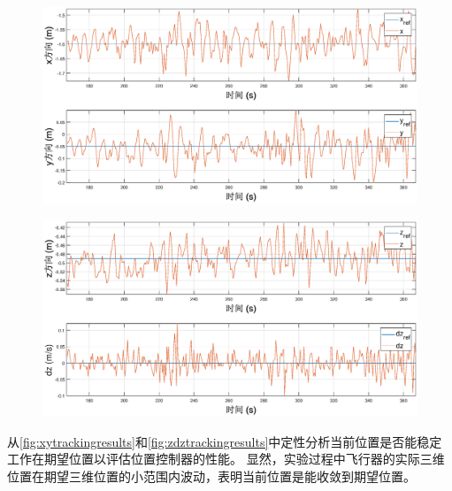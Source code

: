 \documentclass[
  type=master
]{gdutthesis}
\begin{document}
\begin{figure}[H]
	\centering
	\includegraphics[width=1.00\textwidth]{xycontrol1.eps}
	\label{fig:xytrackingresults}
\end{figure}

\begin{figure}[H]
	\centering
	\includegraphics[width=1.00\textwidth]{zdzcontrol1.eps}
	\label{fig:zdztrackingresults}
\end{figure}

从\autoref{fig:xytrackingresults}和\autoref{fig:zdztrackingresults}中定性分析当前位置是否能稳定工作在期望位置以评估位置控制器的性能。
显然，实验过程中飞行器的实际三维位置在期望三维位置的小范围内波动，表明当前位置是能收敛到期望位置。
\end{document}
